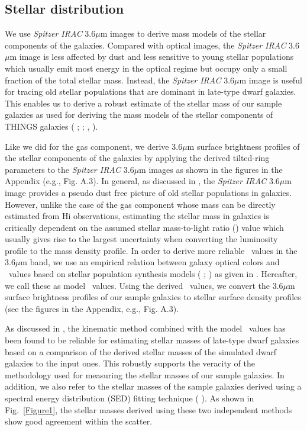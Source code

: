 \documentclass[natbib209]{emulateapj}
\begin{document}
\subsection{Stellar distribution} \label{STELLAR_DISTRIBUTION}

We use {\it Spitzer IRAC} 3.6$\mu$m images to derive mass models of the stellar
components of the galaxies. Compared with optical images, the {\it Spitzer IRAC}
3.6$\mu$m image is less affected by dust and less sensitive to young stellar populations
which usually emit most energy in the optical regime but occupy only a small
fraction of the total stellar mass. Instead, the {\it Spitzer IRAC} 3.6$\mu$m image is
useful for tracing old stellar populations that are dominant in late-type dwarf
galaxies. This enables us to derive a robust estimate of the stellar mass of
our sample galaxies as used for deriving the
mass models of the stellar components of THINGS galaxies
(\citeauthor{deBlok_2008} \citeyear{deBlok_2008}; \citeauthor{Trachternach_2008}
\citeyear{Trachternach_2008}; \citeauthor{Oh_2008} \citeyear{Oh_2008},
\citeyear{Oh_2011a}).

Like we did for the gas component, we derive 3.6$\mu$m surface brightness profiles
of the stellar components of the galaxies by applying the derived tilted-ring
parameters to the {\it Spitzer IRAC} 3.6$\mu$m images as shown in the figures in the Appendix (e.g.,
Fig. A.3). In general, as discussed in \cite{Walter_2008}, the {\it Spitzer
IRAC} 3.6$\mu$m image provides a pseudo dust free picture of old stellar populations in
galaxies. However, unlike the case of the gas component whose mass can be
directly estimated from H{\sc i} observations, estimating the stellar mass in
galaxies is critically dependent on the assumed stellar mass-to-light ratio (\ML)
value which usually gives rise to the largest uncertainty when converting the
luminosity profile to the mass density profile. In order to derive more reliable
\ML\ values in the 3.6$\mu$m band, we use an empirical relation between galaxy optical
colors and \MLsps\ values based on stellar population synthesis models
(\citeauthor{Bruzual_Charlot_2003} \citeyear{Bruzual_Charlot_2003};
\citeauthor{Bell_2001} \citeyear{Bell_2001}) as given in \cite{Oh_2008}. Hereafter, we call these as model \MLsps\ values.
Using the derived \MLsps\ values, we convert the 3.6$\mu$m surface brightness profiles of our
sample galaxies to stellar surface density profiles (see the figures in the
Appendix, e.g., Fig. A.3). 


As discussed in \cite{Oh_2011b}, the kinematic method combined with the model
\MLsps\ values has been found to be reliable for estimating stellar masses of
late-type dwarf galaxies based on a comparison of the derived stellar masses of the
simulated dwarf galaxies to the input ones. This robustly supports the veracity
of the methodology used for measuring the stellar masses of our sample galaxies.
In addition, we also refer to the stellar masses of the sample galaxies derived
using a spectral energy distribution (SED) fitting technique (\citeauthor{Zhang_2012}
\citeyear{Zhang_2012}). As shown in Fig.~\ref{Figure1}, the stellar masses
derived using these two independent methods show good agreement within the scatter. 
\end{document}

